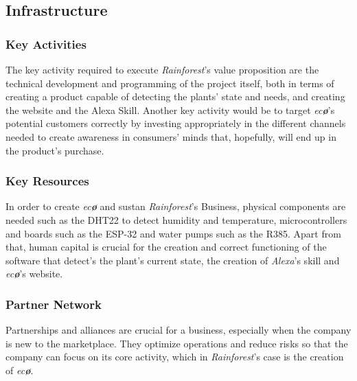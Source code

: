 \documentclass[english,runningheads,a4paper]{llncs}[2018/03/10]
\begin{document}

    \subsection*{Infrastructure}

        \subsubsection*{Key Activities}

        The key activity required to execute \textit{Rainforest}'s value
        proposition are the technical development and programming of the project
        itself, both in terms of creating a product capable of detecting the
        plants' state and needs, and creating the website and the Alexa Skill.
        Another key activity would be to target \textit{ec\textbf{\o}}'s
        potential customers correctly by investing appropriately in the
        different channels needed to create awareness in consumers' minds that,
        hopefully, will end up in the product's purchase.


        \subsubsection*{Key Resources}

        In order to create \textit{ec\textbf{\o}} and sustan
        \textit{Rainforest}'s Business, physical components are needed such as
        the DHT22 to detect humidity and temperature, microcontrollers and
        boards such as the ESP-32 and water pumps such as the R385. Apart from
        that, human capital is crucial for the creation and correct functioning
        of the software that detect's the plant's current state, the creation of
        \textit{Alexa}'s skill and \textit{ec\textbf{\o}}'s website.


        \subsubsection*{Partner Network}

        Partnerships and alliances are crucial for a business, especially when
        the company is new to the marketplace. They optimize operations and
        reduce risks so that the company can focus on its core activity, which
        in \textit{Rainforest}'s case is the creation of \textit{ec\textbf{\o}}.
\end{document}
